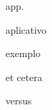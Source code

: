\documentclass[oneside,english,brazilian]{UNISINOSmonografia}
\begin{document}
\listoftables

%
\begin{listadeabreviaturas}{app.}
\item[app.] aplicativo
\item[ex.] exemplo
\item[etc.] et cetera
\item[vs.] versus
\end{listadeabreviaturas}
\end{document}
